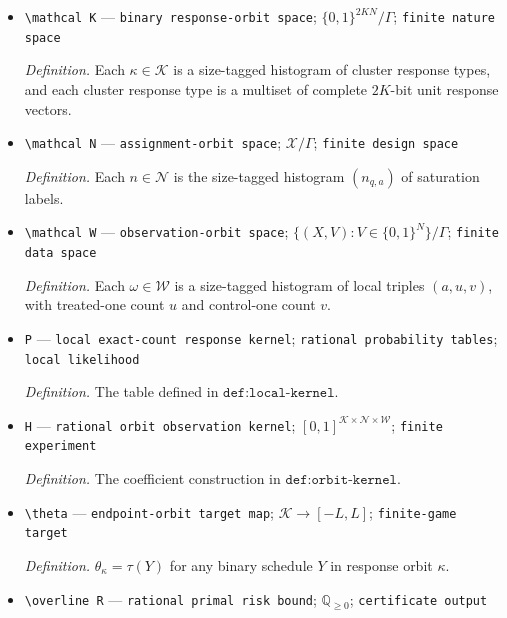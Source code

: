 \documentclass{article}
\begin{document}
\begin{itemize}
  \par\smallskip\noindent\emph{Definition.} \(\Gamma\) permutes units within clusters and permutes equal-size clusters, where \(m_q=|\{g:s_g=q\}|\).
  \item \texttt{\textbackslash{}\allowbreak{}mathcal K} --- \texttt{binary response-\allowbreak{}orbit space}; \(\{0,1\}^{2KN}/\Gamma\); \texttt{finite nature space}
  \par\smallskip\noindent\emph{Definition.} Each \(\kappa\in\mathcal K\) is a size-tagged histogram of cluster response types, and each cluster response type is a multiset of complete \(2K\)-bit unit response vectors.
  \item \texttt{\textbackslash{}\allowbreak{}mathcal N} --- \texttt{assignment-\allowbreak{}orbit space}; \(\mathcal X/\Gamma\); \texttt{finite design space}
  \par\smallskip\noindent\emph{Definition.} Each \(n\in\mathcal N\) is the size-tagged histogram \((n_{q,a})\) of saturation labels.
  \item \texttt{\textbackslash{}\allowbreak{}mathcal W} --- \texttt{observation-\allowbreak{}orbit space}; \(\{(X,V):V\in\{0,1\}^N\}/\Gamma\); \texttt{finite data space}
  \par\smallskip\noindent\emph{Definition.} Each \(\omega\in\mathcal W\) is a size-tagged histogram of local triples \((a,u,v)\), with treated-one count \(u\) and control-one count \(v\).
  \item \texttt{P} --- \texttt{local exact-\allowbreak{}count response kernel}; \texttt{rational probability tables}; \texttt{local likelihood}
  \par\smallskip\noindent\emph{Definition.} The table defined in \(\texttt{def:local-kernel}\).
  \item \texttt{H} --- \texttt{rational orbit observation kernel}; \([0,1]^{\mathcal K\times\mathcal N\times\mathcal W}\); \texttt{finite experiment}
  \par\smallskip\noindent\emph{Definition.} The coefficient construction in \(\texttt{def:orbit-kernel}\).
  \item \texttt{\textbackslash{}\allowbreak{}theta} --- \texttt{endpoint-\allowbreak{}orbit target map}; \(\mathcal K\to[-L,L]\); \texttt{finite-\allowbreak{}game target}
  \par\smallskip\noindent\emph{Definition.} \(\theta_\kappa=\tau(Y)\) for any binary schedule \(Y\) in response orbit \(\kappa\).
  \item \texttt{\textbackslash{}\allowbreak{}overline R} --- \texttt{rational primal risk bound}; \(\mathbb Q_{\ge0}\); \texttt{certificate output}

\end{itemize}
\end{document}
